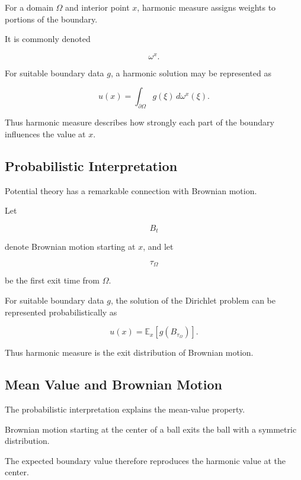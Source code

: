 For a domain \(\Omega\) and interior point \(x\), harmonic measure assigns
weights to portions of the boundary.

It is commonly denoted

\[
\boxed{
\omega^x.
}
\]

For suitable boundary data \(g\), a harmonic solution may be represented
as

\[
\boxed{
u(x)
=
\int_{\partial\Omega}
g(\xi)\,d\omega^x(\xi).
}
\]

Thus harmonic measure describes how strongly each part of the boundary
influences the value at \(x\).

\subsection{Probabilistic Interpretation}
\label{subsec:potential-probabilistic-interpretation}

Potential theory has a remarkable connection with Brownian motion.

Let

\[
B_t
\]

denote Brownian motion starting at \(x\), and let

\[
\tau_\Omega
\]

be the first exit time from \(\Omega\).

For suitable boundary data \(g\), the solution of the Dirichlet problem
can be represented probabilistically as

\[
\boxed{
u(x)
=
\mathbb{E}_x
\left[
g(B_{\tau_\Omega})
\right].
}
\]

Thus harmonic measure is the exit distribution of Brownian motion.

\subsection{Mean Value and Brownian Motion}
\label{subsec:mean-value-brownian-motion}

The probabilistic interpretation explains the mean-value property.

Brownian motion starting at the center of a ball exits the ball with a
symmetric distribution.

The expected boundary value therefore reproduces the harmonic value at
the center.

